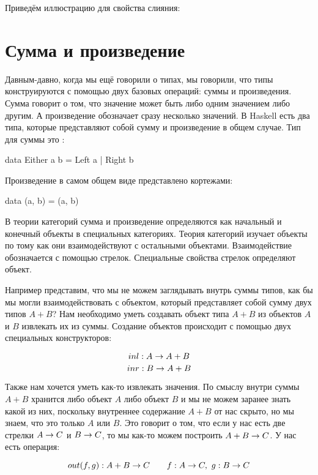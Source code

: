Приведём иллюстрацию для свойства слияния:



\section{Сумма и произведение}


Давным-давно, когда мы ещё говорили о типах, мы
говорили, что типы конструируются с помощью двух базовых
операций: суммы и произведения. Сумма говорит о
том, что значение может быть либо одним значением либо другим.
А произведение обозначает сразу несколько значений. 
В Haskell есть два типа, которые представляют собой сумму и 
произведение в общем случае. Тип для суммы
это :

\begin{code}
data Either a b = Left a | Right b
\end{code}

Произведение в самом общем виде представлено кортежами:

\begin{code}
data (a, b) = (a, b)
\end{code}

В теории категорий  сумма и произведение определяются 
как начальный и конечный объекты в специальных категориях.
Теория категорий изучает объекты по тому как они
взаимодействуют с остальными объектами. Взаимодействие
обозначается с помощью стрелок. Специальные свойства
стрелок определяют объект. 

Например представим, что мы не можем заглядывать внутрь
суммы типов, как бы мы могли взаимодействовать с объектом,
который представляет собой сумму двух типов \mbox{$A+B$?} 
Нам необходимо уметь создавать объект типа $A+B$ 
из объектов $A$ и $B$ извлекать их из суммы. Создание объектов происходит
с помощью двух специальных конструкторов:


\[ inl : A \rightarrow A+B \]
\[ inr : B \rightarrow A+B \]

Также нам хочется уметь как-то извлекать значения.
По смыслу внутри суммы $A+B$ хранится либо объект $A$ 
либо объект $B$ и мы не можем заранее знать какой
из них, поскольку внутреннее содержание $A+B$ от
нас скрыто, но мы знаем, что это только $A$ 
или $B$. Это говорит о том, что если у нас есть две 
стрелки $A \rightarrow C$ и $B \rightarrow C$, то мы как-то можем построить
$A+B \rightarrow C$. У нас есть операция:

\[ out(f,g) : A+B \rightarrow C \qquad f : A \rightarrow C,\ g : B \rightarrow C \]

